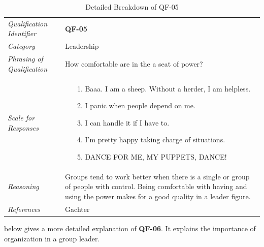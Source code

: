 \documentclass[12pt,letterpaper]{article}
\begin{document}
\begin{table}[H]
	\caption{Detailed Breakdown of QF-05}
	\begin{tabu} to 
		\toprule
		Qualification Identifier & {\bf QF-05}\\
		Category & Leadership \\
		Phrasing of Qualification & How comfortable are in the a seat of power? \\
		Scale for Responses &
		\begin{minipage}[t]{\linewidth}
			\begin{enumerate}
				\item[1.] Baaa. I am a sheep. Without a herder, I am helpless.
				\item[2.] I panic when people depend on me.
				\item[3.] I can handle it if I have to.
				\item[4.] I'm pretty happy taking charge of situations.
				\item[5.] DANCE FOR ME, MY PUPPETS, DANCE!\cite{himym}
			\end{enumerate}
		\end{minipage}\\
		Reasoning & Groups tend to work better when there is a single or group of people with control. Being comfortable with having and using the power makes for a good quality in a leader figure.\\
		References & Gachter\cite{gachter}\\
		\toprule
	\end{tabu}
\end{table}

 below gives a more detailed explanation of {\bf QF-06}. It explains the importance of organization in a group leader.
\end{document}
